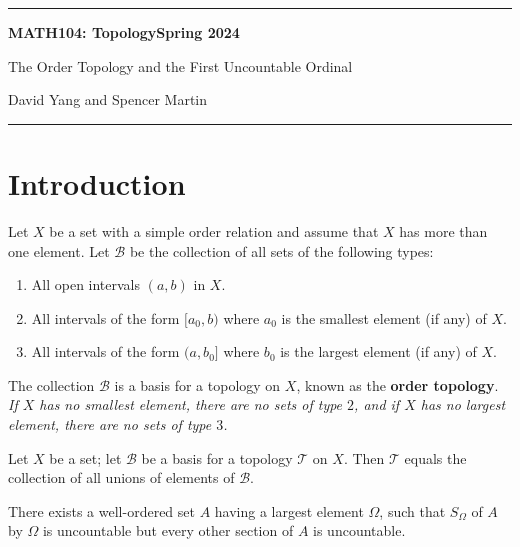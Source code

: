\documentclass[11pt]{article}
\begin{document}
	\hrule
	\begin{center}
        \textbf{MATH104: Topology}\hfill \textbf{Spring 2024}\newline

		{\Large The Order Topology and the First Uncountable Ordinal}

		David Yang and Spencer Martin
	\end{center}

\hrule

\vspace{1em}

\section{Introduction}

\begin{definition}
Let $X$ be a set with a simple order relation and assume that $X$ has more than one element. Let $\mathscr{B}$ be the collection of all sets of the following types:
\begin{enumerate}
    \item All open intervals $(a, b)$ in $X$.
    \item All intervals of the form $[a_0, b)$ where $a_0$ is the smallest element (if any) of $X$.
    \item All intervals of the form $(a, b_0]$ where $b_0$ is the largest element (if any) of $X$.
\end{enumerate}

The collection $\mathscr{B}$ is a basis for a topology on $X$, known as the \textbf{order topology}. \\

\textit{If $X$ has no smallest element, there are no sets of type $2$, and if $X$ has no largest element, there are no sets of type $3$.}
\end{definition}

\begin{lemma}
Let $X$ be a set; let $\mathscr{B}$ be a basis for a topology $\mathcal{T}$ on $X$. Then $\mathcal{T}$ equals the collection of all unions of elements of $\mathscr{B}$.
\end{lemma}


\begin{lemma}
There exists a well-ordered set $A$ having a largest element $\Omega$, such that $S_\Omega$ of $A$ by $\Omega$
is uncountable but every other section of $A$ is uncountable.
\end{lemma}
\end{document}
